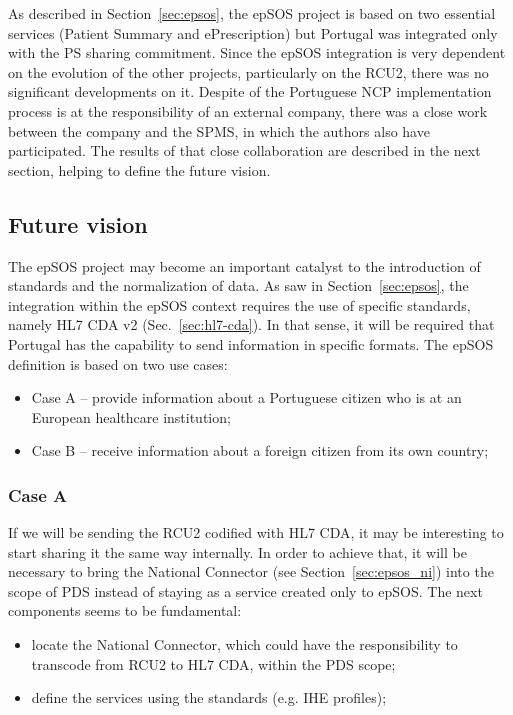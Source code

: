 As described in Section~\ref{sec:epsos}, the epSOS project is based on two essential services (Patient Summary and ePrescription) but Portugal was integrated only with the PS sharing commitment. Since the epSOS integration is very dependent on the evolution of the other projects, particularly on the RCU2, there was no significant developments on it. Despite of the Portuguese NCP implementation process is at the responsibility of an external company, there was a close work between the company and the SPMS, in which the authors also have participated. The results of that close collaboration are described in the next section, helping to define the future vision.

\subsection{Future vision}

The epSOS project may become an important catalyst to the introduction of standards and the normalization of data. As saw in Section~\ref{sec:epsos}, the integration within the epSOS context requires the use of specific standards, namely HL7 CDA v2 (Sec.~\ref{sec:hl7-cda}). In that sense, it will be required that Portugal has the capability to send information in specific formats. The epSOS definition is based on two use cases:
\begin{itemize}
\item Case A -- provide information about a Portuguese citizen who is at an European healthcare institution;
\item Case B -- receive information about a foreign citizen from its own country;
\end{itemize}


\subsubsection{Case A}

If we will be sending the RCU2 codified with HL7 CDA, it may be interesting to start sharing it the same way internally. In order to achieve that, it will be necessary to bring the National Connector (see Section~\ref{sec:epsos_ni}) into the scope of PDS instead of staying as a service created only to epSOS. The next components seems to be fundamental:
\begin{itemize}
\item locate the National Connector, which could have the responsibility to transcode from RCU2 to HL7 CDA, within the PDS scope;
\item define the services using the standards (e.g. IHE profiles); %
\end{itemize}

